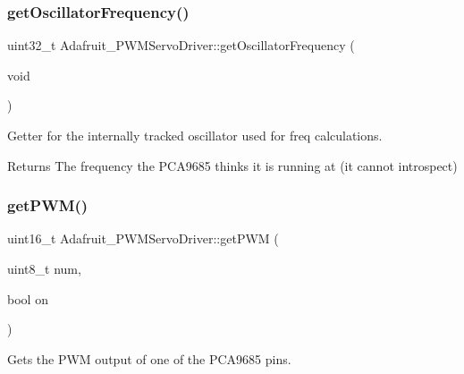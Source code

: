 \subsubsection{\texorpdfstring{get\+Oscillator\+Frequency()}{getOscillatorFrequency()}}
{\footnotesize\ttfamily uint32\+\_\+t Adafruit\+\_\+\+P\+W\+M\+Servo\+Driver\+::get\+Oscillator\+Frequency (\begin{DoxyParamCaption}\item[{void}]{ }\end{DoxyParamCaption})}



Getter for the internally tracked oscillator used for freq calculations. 

\begin{DoxyReturn}{Returns}
The frequency the P\+C\+A9685 thinks it is running at (it cannot introspect) 
\end{DoxyReturn}
\mbox{\label{classAdafruit__PWMServoDriver_a7eaeeed5408ea7382731f7e1ea01defb}} 
\subsubsection{\texorpdfstring{get\+P\+W\+M()}{getPWM()}}
{\footnotesize\ttfamily uint16\+\_\+t Adafruit\+\_\+\+P\+W\+M\+Servo\+Driver\+::get\+P\+WM (\begin{DoxyParamCaption}\item[{uint8\+\_\+t}]{num,  }\item[{bool}]{on }\end{DoxyParamCaption})}



Gets the P\+WM output of one of the P\+C\+A9685 pins. 


